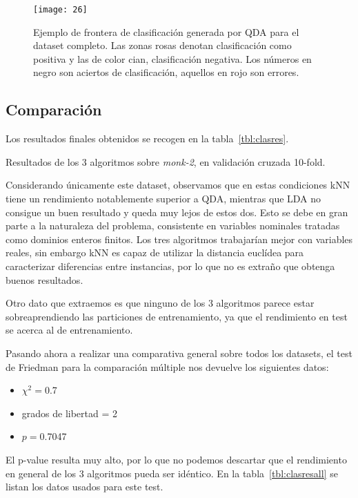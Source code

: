 \documentclass[a4paper, 11pt]{article}
\begin{document}
\begin{figure}[ht]
  \texttt{[image: 26]}
  \caption{\label{fig:partimat}Ejemplo de frontera de clasificación generada por QDA para el dataset completo. Las zonas rosas denotan clasificación como positiva y las de color cian, clasificación negativa. Los números en negro son aciertos de clasificación, aquellos en rojo son errores.}
  
\end{figure}

\subsection{Comparación}

Los resultados finales obtenidos se recogen en la tabla~\ref{tbl:clasres}.

\begin{table}[ht]
  \caption{\label{tbl:clasres}Resultados de los 3 algoritmos sobre \textit{monk-2}, en validación cruzada 10-fold.}
  
  
\end{table}

Considerando únicamente este dataset, observamos que en estas condiciones kNN tiene un rendimiento notablemente superior a QDA, mientras que LDA no consigue un buen resultado y queda muy lejos de estos dos. Esto se debe en gran parte a la naturaleza del problema, consistente en variables nominales tratadas como dominios enteros finitos. Los tres algoritmos trabajarían mejor con variables reales, sin embargo kNN es capaz de utilizar la distancia euclídea para caracterizar diferencias entre instancias, por lo que no es extraño que obtenga buenos resultados.

Otro dato que extraemos es que ninguno de los 3 algoritmos parece estar sobreaprendiendo las particiones de entrenamiento, ya que el rendimiento en test se acerca al de entrenamiento.

Pasando ahora a realizar una comparativa general sobre todos los datasets, el test de Friedman para la comparación múltiple nos devuelve los siguientes datos:
\begin{itemize}
\item $\chi^2=0$.7
\item grados de libertad = 2
\item $p=0$.7047
\end{itemize}
El p-value resulta muy alto, por lo que no podemos descartar que el rendimiento en general de los 3 algoritmos pueda ser idéntico. En la tabla~\ref{tbl:clasresall} se listan los datos usados para este test.
\end{document}
